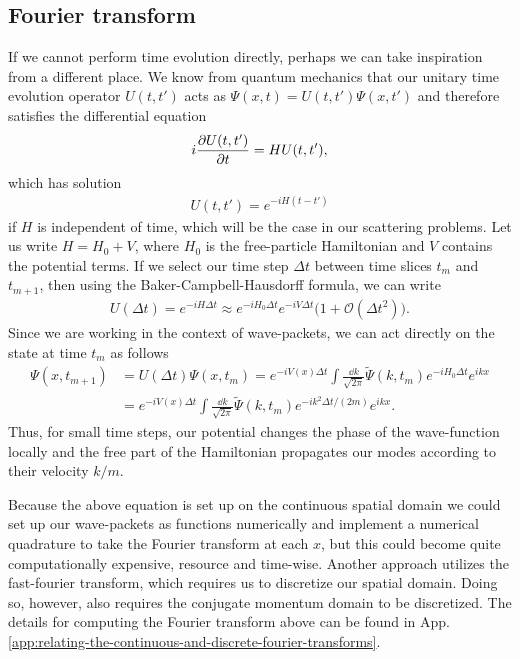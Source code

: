 \subsection{Fourier transform}

If we cannot perform time evolution directly, perhaps we can take inspiration from a different place.
We know from quantum mechanics that our unitary time evolution operator $U(t,t')$ acts as $\Psi(x,t) = U(t,t') \Psi(x,t')$ and therefore satisfies the differential equation
\begin{align}
    i \pdv{U(t,t')}{t} = H U(t,t')
,\end{align}
which has solution
\begin{align}
    U(t,t') = e^{-i H (t - t')}
\end{align}
if $H$ is independent of time, which will be the case in our scattering problems.
Let us write $H = H_0 + V$, where $H_0$ is the free-particle Hamiltonian and $V$ contains the potential terms.
If we select our time step $\Delta t$ between time slices $t_{m}$ and $t_{m+1}$, then using the Baker-Campbell-Hausdorff formula, we can write
\begin{align}
    U(\Delta t) = e^{-i H \Delta t} \approx e^{-i H_0 \Delta t} e^{-i V \Delta t} \Big( 1 + \mathcal{O}(\Delta t^2) \Big)
.\end{align}
Since we are working in the context of wave-packets, we can act directly on the state at time $t_{m}$ as follows
\begin{align}
    \Psi(x,t_{m+1}) &= U(\Delta t) \Psi(x,t_{m}) = e^{-i V(x) \Delta t} \int \frac{\dd{k}}{\sqrt{2 \pi}} \widetilde{\Psi}(k,t_{m}) e^{-i H_0 \Delta t} e^{i k x} \nonumber \\
    &= e^{-i V(x) \Delta t} \int \frac{\dd{k}}{\sqrt{2 \pi}} \widetilde{\Psi}(k,t_{m}) e^{- i k^2 \Delta t / (2m)} e^{i k x}
.\end{align}
Thus, for small time steps, our potential changes the phase of the wave-function locally and the free part of the Hamiltonian propagates our modes according to their velocity $k/m$.

Because the above equation is set up on the continuous spatial domain we could set up our wave-packets as functions numerically and implement a numerical quadrature to take the Fourier transform at each $x$, but this could become quite computationally expensive, resource and time-wise.
Another approach utilizes the fast-fourier transform, which requires us to discretize our spatial domain.
Doing so, however, also requires the conjugate momentum domain to be discretized.
The details for computing the Fourier transform above can be found in App. \ref{app:relating-the-continuous-and-discrete-fourier-transforms}.

